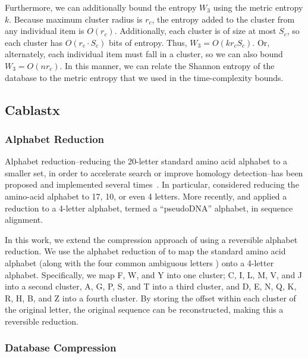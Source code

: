 \documentclass[review,preprint,12pt]{elsarticle}
\renewcommand{\cite}{\citep} %
\theoremstyle{definition}
\theoremstyle{remark}
\numberwithin{equation}{section}
\begin{document}
Furthermore, we can additionally bound the entropy $W_3$ using the metric entropy $k$.
Because maximum cluster radius is $r_c$, the entropy added to the cluster from any individual item is $O(r_c)$.
Additionally, each cluster is of size at most $S_c$, so each cluster has $O(r_c \cdot S_c)$ bits of entropy.
Thus, $W_3 = O(k r_c S_c)$.
Or, alternately, each individual item must fall in a cluster, so we can also bound $W_3 = O(n r_c)$.
In this manner, we can relate the Shannon entropy of the database to the metric entropy that we used in the time-complexity bounds.

\subsection{Cablastx}

\subsubsection{Alphabet Reduction}

Alphabet reduction--reducing the 20-letter standard amino acid alphabet to a
smaller set, in order to accelerate search or improve homology detection--has
been proposed and implemented several times~\cite{bacardit2007automated, peterson2009reduced}.
In particular, \citet{murphy2000simplified} considered reducing the
amino-acid alphabet to 17, 10, or even 4 letters.
More recently, \citet{zhao2012rapsearch2} and \citet{huson2013poor} applied a reduction to
a 4-letter alphabet, termed a ``pseudoDNA'' alphabet, in sequence alignment.

In this work, we extend the compression approach of 
\citet{daniels2013compressive} using a reversible alphabet reduction.
We use the alphabet reduction of \citet{murphy2000simplified} to map the 
standard amino
acid alphabet (along with the four common ambiguous letters ) onto a 4-letter 
alphabet.
Specifically, we map F, W, and Y into one cluster; C, I, L, M, V, and J into
a second cluster, A, G, P, S, and T into a third cluster, and
D, E, N, Q, K, R, H, B, and Z into a fourth cluster.
By storing the offset within each cluster of the original letter, the original
sequence can be reconstructed, making this a reversible reduction.

\subsubsection{Database Compression}
\end{document}
